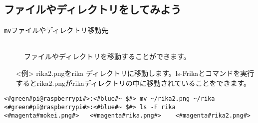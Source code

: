 \subsection{ファイルやディレクトリをしてみよう}
\begin{description}
\item[\texttt{mv}\textvisiblespace ファイルやディレクトリ\textvisiblespace 移動先]\mbox{}\\
ファイルやディレクトリを移動することができます。
\end{description}
\begin{itemize}
\item[<例>]rika2.pngをrika ディレクトリに移動します。ls\textvisiblespace -F\textvisiblespace rikaとコマンドを実行するとrika2.pngがrikaディレクトリの中に移動されていることをできます。
\end{itemize}
\begin{lstlisting}[caption=mvの例, label=mv]
<#green#pi@raspberrypi#>:<#blue#~ $#> mv ~/rika2.png ~/rika
<#green#pi@raspberrypi#>:<#blue#~ $#> ls -F rika
<#magenta#mokei.png#>	<#magenta#rika.png#>	<#magenta#rika2.png#>
\end{lstlisting}

\begin{tcolorbox}[title=\useOmetoi]
\begin{enumerate}
\end{enumerate}
\end{tcolorbox}
